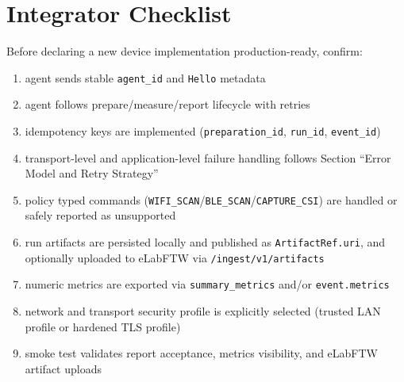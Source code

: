 \documentclass[11pt,a4paper]{article}
\begin{document}
\section{Integrator Checklist}
Before declaring a new device implementation production-ready, confirm:
\begin{enumerate}
  \item agent sends stable \texttt{agent\_id} and \texttt{Hello} metadata
  \item agent follows prepare/measure/report lifecycle with retries
  \item idempotency keys are implemented (\texttt{preparation\_id}, \texttt{run\_id}, \texttt{event\_id})
  \item transport-level and application-level failure handling follows Section ``Error Model and Retry Strategy''
  \item policy typed commands (\texttt{WIFI\_SCAN}/\texttt{BLE\_SCAN}/\texttt{CAPTURE\_CSI}) are handled or safely reported as unsupported
  \item run artifacts are persisted locally and published as \texttt{ArtifactRef.uri}, and optionally uploaded to eLabFTW via \texttt{/ingest/v1/artifacts}
  \item numeric metrics are exported via \texttt{summary\_metrics} and/or \texttt{event.metrics}
  \item network and transport security profile is explicitly selected (trusted LAN profile or hardened TLS profile)
  \item smoke test validates report acceptance, metrics visibility, and eLabFTW artifact uploads
\end{enumerate}
\end{document}
